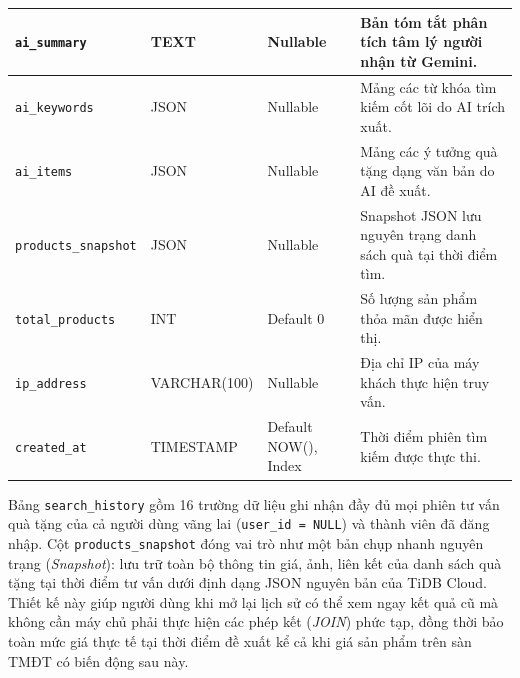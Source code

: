 \begin{table}[htbp]
\begin{tabularx}{\textwidth}{|p{3.0cm}|p{2.6cm}|p{2.8cm}|X|}
\hline
\texttt{ai\_summary} & TEXT & Nullable & Bản tóm tắt phân tích tâm lý người nhận từ Gemini. \\
\hline
\texttt{ai\_keywords} & JSON & Nullable & Mảng các từ khóa tìm kiếm cốt lõi do AI trích xuất. \\
\hline
\texttt{ai\_items} & JSON & Nullable & Mảng các ý tưởng quà tặng dạng văn bản do AI đề xuất. \\
\hline
\texttt{products\_snapshot} & JSON & Nullable & Snapshot JSON lưu nguyên trạng danh sách quà tại thời điểm tìm. \\
\hline
\texttt{total\_products} & INT & Default 0 & Số lượng sản phẩm thỏa mãn được hiển thị. \\
\hline
\texttt{ip\_address} & VARCHAR(100) & Nullable & Địa chỉ IP của máy khách thực hiện truy vấn. \\
\hline
\texttt{created\_at} & TIMESTAMP & Default NOW(), Index & Thời điểm phiên tìm kiếm được thực thi. \\
\hline
\end{tabularx}
\end{table}

Bảng \texttt{search\_history} gồm 16 trường dữ liệu ghi nhận đầy đủ mọi phiên tư vấn quà tặng của cả người dùng vãng lai (\texttt{user\_id = NULL}) và thành viên đã đăng nhập. Cột \texttt{products\_snapshot} đóng vai trò như một bản chụp nhanh nguyên trạng (\textit{Snapshot}): lưu trữ toàn bộ thông tin giá, ảnh, liên kết của danh sách quà tặng tại thời điểm tư vấn dưới định dạng JSON nguyên bản của TiDB Cloud. Thiết kế này giúp người dùng khi mở lại lịch sử có thể xem ngay kết quả cũ mà không cần máy chủ phải thực hiện các phép kết (\textit{JOIN}) phức tạp, đồng thời bảo toàn mức giá thực tế tại thời điểm đề xuất kể cả khi giá sản phẩm trên sàn TMĐT có biến động sau này.

